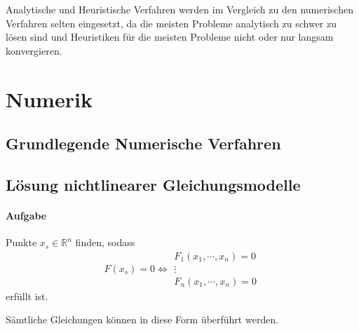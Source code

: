\documentclass[a4paper, 11pt, accentcolor = tud3b]{tudreport}
\begin{document}
            Analytische und Heuristische Verfahren werden im Vergleich zu den numerischen Verfahren selten eingesetzt, da die meisten Probleme analytisch zu schwer zu lösen sind und Heuristiken für die meisten Probleme nicht oder nur langsam konvergieren.

	    \section{Numerik} %
		    \subsection{Grundlegende Numerische Verfahren}
			    
	    
            \subsection{Lösung nichtlinearer Gleichungsmodelle} %
                \paragraph{Aufgabe}
	                Punkte \( x _ s \in \mathbb{R} ^ n \) finden, sodass
	                \begin{equation*}
		                F(x _ s) = 0 \iff
		                \begin{matrix}
			                F _ 1 (x _ 1, \cdots, x _ n) = 0 \\
			                \vdots \\
			                F _ n (x _ 1, \cdots, x _ n) = 0
		                \end{matrix}
	                \end{equation*}
	                erfüllt ist.
	                
	                Sämtliche Gleichungen können in diese Form überführt werden.
\end{document}
